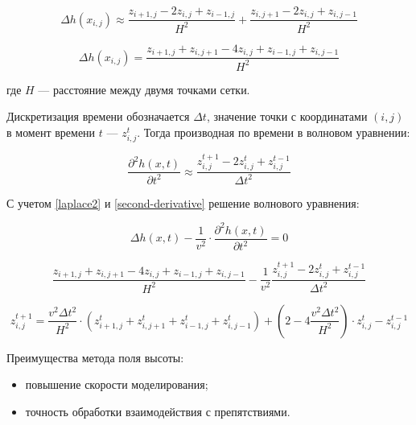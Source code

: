 \begin{equation}
    \label{laplace1}
    \Delta h(x_{i,j}) \approx \frac{z_{i+1,j} - 2z_{i,j} + z_{i-1,j}}{H^2} + \frac{z_{i,j+1} - 2z_{i,j} + z_{i,j-1}}{H^2}
\end{equation}

\begin{equation}
    \label{laplace2}
    \Delta h(x_{i,j}) = \frac{z_{i+1,j} + z_{i,j+1} - 4z_{i,j} + z_{i-1,j} + z_{i,j-1}}{H^2}
\end{equation}

где $H$ --- расстояние между двумя точками сетки.

Дискретизация времени обозначается $\Delta t$, значение точки с координатами $(i,j)$ в момент времени $t$ --- $z^t_{i,j}$. Тогда производная по времени в волновом уравнении:

\begin{equation}
    \label{second-derivative}
    \frac{\partial ^2h(x,t)}{\partial t^2} \approx \frac{z^{t+1}_{i,j} - 2z^t_{i,j} + z^{t-1}_{i,j}}{\Delta t^2}
\end{equation}

С учетом \ref{laplace2} и \ref{second-derivative} решение волнового уравнения:

\begin{equation}
    \label{1}
    \Delta h(x,t) - \frac{1}{v^2} \cdot \frac{\partial ^2h(x,t)}{\partial t^2} = 0
\end{equation}

\begin{equation}
    \label{2}
    \frac{z_{i+1,j} + z_{i,j+1} - 4z_{i,j} + z_{i-1,j} + z_{i,j-1}}{H^2} - \frac{1}{v^2} \frac{z^{t+1}_{i,j} - 2z^t_{i,j} + z^{t-1}_{i,j}}{\Delta t^2}
\end{equation}

\begin{equation}
    \label{3}
    z^{t+1}_{i,j} = \frac{v^2 \Delta t^2}{H^2} \cdot (z^t_{i+1,j} + z^t_{i,j+1} + z^t_{i-1,j} + z^t_{i,j-1}) + (2-4\frac{v^2 \Delta t^2}{H^2}) \cdot z^t_{i,j} - z^ {t-1}_{i,j}
\end{equation}

Преимущества метода поля высоты:

\begin{itemize}
	\item повышение скорости моделирования;
	\item точность обработки взаимодействия с препятствиями.
\end{itemize}

